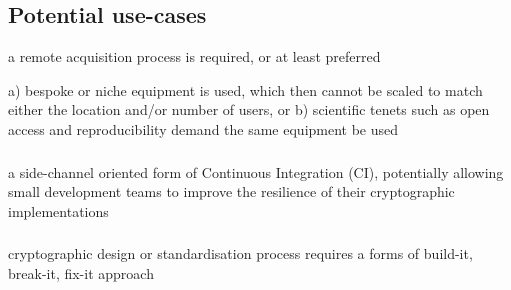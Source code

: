 
\subsection{Potential use-cases}

a remote acquisition process is required, or at least preferred


a) bespoke or niche equipment is used, which then cannot be scaled to 
   match either the location and/or number of users,
   or
b) scientific tenets such as open access and reproducibility demand
   the same equipment be used 


\subsubsection{}
a side-channel oriented form of Continuous Integration (CI), potentially allowing small development teams to improve the resilience of their cryptographic implementations


\subsubsection{}
cryptographic design or standardisation process requires a forms of build-it, break-it, fix-it approach



